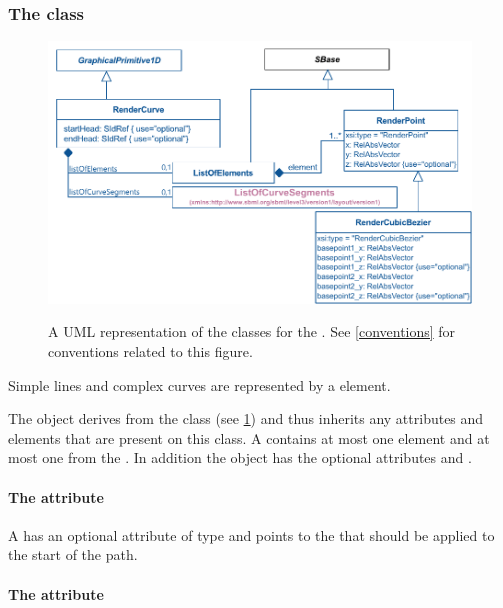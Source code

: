 \subsubsection{The  class}
\label{rendercurve-class}
\begin{figure}[!ht]
  \centering
  \includegraphics{images/render-curve-uml}\\
  \caption{A UML representation of the \RenderCurve classes for the \RenderPackage.  See \ref{conventions} for conventions related to this figure. }
  \label{fig:curve_render_uml}
\end{figure}

Simple lines and complex curves are represented by a \RenderCurve element. 

The \RenderCurve object derives from the \GraphicalPrimitiveOneD class (see \ref{fig:curve_render_uml})
and thus inherits any attributes and elements that are present on this
class.
A \RenderCurve contains at most one \ListOfElements element and at most one  from the \LayoutPackage.
In addition the \RenderCurve object has the optional attributes  and .

\paragraph{The \fixttspace{} attribute}

A \RenderCurve has an optional attribute  of type
 and points to the \LineEnding that should be applied to the start of the path.

\paragraph{The \fixttspace{} attribute}

